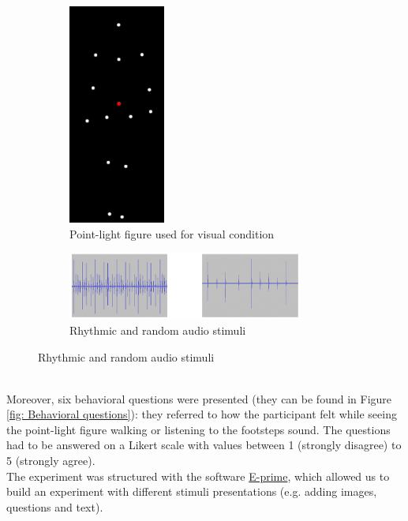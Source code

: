 \begin{figure}[h]
    \centering
    \begin{subfigure}[h]{0.4\textwidth}
        \centering
        \includegraphics[width=0.35\textwidth]{appendix/point_light_figure.png}
        \caption{Point-light figure used for visual condition}
        \label{fig: visual stimuli}
    \end{subfigure}
    \hspace{4em}
    \begin{subfigure}[h]{0.4\textwidth}
        \centering
        \includegraphics[width=0.85\textwidth]{appendix/audio_images.png}
        \caption{Rhythmic and random audio stimuli}
        \label{fig: audio stimuli}
    \end{subfigure}
    \label{fig: stimuli}   
\end{figure} \\
Moreover, six behavioral questions were presented (they can be found in Figure \ref{fig: Behavioral questions}): they referred to how the participant felt while seeing the point-light figure walking or listening to the footsteps sound. The questions had to be answered on a Likert scale with values between 1 (strongly disagree) to 5 (strongly agree). \\
The experiment was structured with the software \href{https://pstnet.com/products/e-prime/}{E-prime}, which allowed us to build an experiment with different stimuli presentations (e.g. adding images, questions and text).

